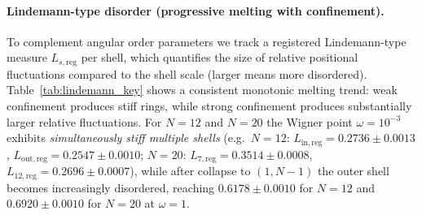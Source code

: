 \documentclass[superscriptaddress,unsortedaddress,amsmath,amssymb,aps]{revtex4-2}
\begin{document}
\paragraph{Lindemann-type disorder (progressive melting with confinement).}
To complement angular order parameters we track a registered Lindemann-type measure $L_{s,\mathrm{reg}}$ per shell,
which quantifies the size of relative positional fluctuations compared to the shell scale (larger means more disordered).
Table~\ref{tab:lindemann_key} shows a consistent monotonic melting trend: weak confinement produces stiff rings, while
strong confinement produces substantially larger relative fluctuations. For $N=12$ and $N=20$ the Wigner point
$\omega=10^{-3}$ exhibits \emph{simultaneously stiff multiple shells} (e.g.\ $N=12$: $L_{\mathrm{in,reg}}=0.2736\pm0.0013$,
$L_{\mathrm{out,reg}}=0.2547\pm0.0010$; $N=20$: $L_{7,\mathrm{reg}}=0.3514\pm0.0008$, $L_{12,\mathrm{reg}}=0.2696\pm0.0007$),
while after collapse to $(1,N{-}1)$ the outer shell becomes increasingly disordered, reaching $0.6178\pm0.0010$ for
$N=12$ and $0.6920\pm0.0010$ for $N=20$ at $\omega=1$.
\end{document}
